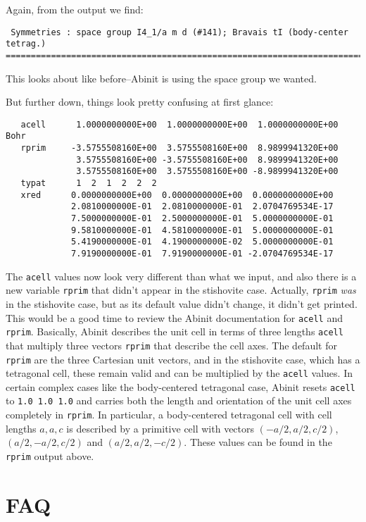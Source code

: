 \documentclass{article}
\begin{document}
Again, from the output we find:
\begin{verbatim}
 Symmetries : space group I4_1/a m d (#141); Bravais tI (body-center tetrag.)
================================================================================
\end{verbatim}
This looks about like before--{\sc Abinit} is using the space group we wanted.

But further down, things look pretty confusing at first glance:
\begin{verbatim}
   acell      1.0000000000E+00  1.0000000000E+00  1.0000000000E+00 Bohr
   rprim     -3.5755508160E+00  3.5755508160E+00  8.9899941320E+00
              3.5755508160E+00 -3.5755508160E+00  8.9899941320E+00
              3.5755508160E+00  3.5755508160E+00 -8.9899941320E+00
   typat      1  2  1  2  2  2
   xred      0.0000000000E+00  0.0000000000E+00  0.0000000000E+00
             2.0810000000E-01  2.0810000000E-01  2.0704769534E-17
             7.5000000000E-01  2.5000000000E-01  5.0000000000E-01
             9.5810000000E-01  4.5810000000E-01  5.0000000000E-01
             5.4190000000E-01  4.1900000000E-02  5.0000000000E-01
             7.9190000000E-01  7.9190000000E-01 -2.0704769534E-17
\end{verbatim}
The {\tt acell} values now look very different than what we input, and also there is a new
variable {\tt rprim} that didn't appear in the stishovite case. Actually, {\tt rprim} {\em was}
in the stishovite case, but as its default value didn't change, it didn't get printed. This would
be a good time to review the {\sc Abinit} documentation for {\tt acell} and {\tt rprim}. Basically,
{\sc Abinit} describes the unit cell in terms of three lengths {\tt acell} that multiply three
vectors {\tt rprim} that describe the cell axes. The default for {\tt rprim} are the three 
Cartesian unit vectors, and in the stishovite case, which has a tetragonal cell, these remain
valid and can be multiplied by the {\tt acell} values. In certain complex cases like the body-centered
tetragonal case, {\sc Abinit} resets {\tt acell} to {\tt 1.0 1.0 1.0} and carries both the
length and orientation of the unit cell axes completely in {\tt rprim}. In particular, a body-centered
tetragonal cell with cell lengths $a,a,c$ is described by a primitive cell with vectors
$(-a/2,a/2,c/2)$, $(a/2, -a/2, c/2)$ and $(a/2,a/2,-c/2)$. These values can be found in the
{\tt rprim} output above. 

\section{FAQ}
\end{document}
